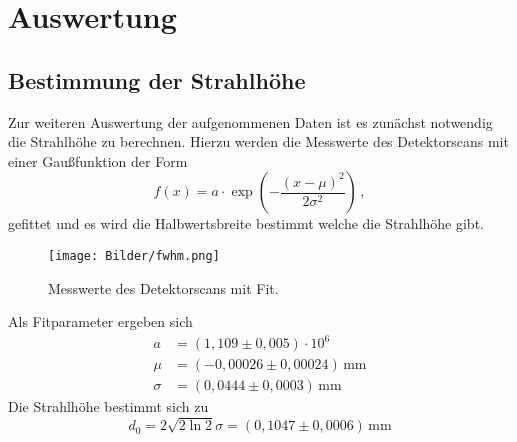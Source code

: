 \section{Auswertung}
\subsection{Bestimmung der Strahlhöhe}
Zur weiteren Auswertung der aufgenommenen Daten ist es zunächst notwendig die Strahlhöhe zu berechnen. Hierzu werden die Messwerte des Detektorscans mit einer Gaußfunktion der Form
\begin{equation}
  f(x)=a\cdot \exp\left(-\frac{(x-\mu)^2}{2\sigma^2}\right)\,,
\end{equation}
gefittet und es wird die Halbwertsbreite bestimmt welche die Strahlhöhe gibt.
\begin{figure}[h]
  \centering
  \texttt{[image: Bilder/fwhm.png]}
  \caption{Messwerte des Detektorscans mit Fit.}
\end{figure}
Als Fitparameter ergeben sich
\begin{align}
a&=(1{,}109\pm0{,}005)\cdot10^6\nonumber\\
\mu&=(-0{,}00026\pm0{,}00024)\,\si{\mm}\nonumber\\
\sigma&=(0{,}0444\pm0{,}0003)\,\si{\mm}
\end{align}
Die Strahlhöhe bestimmt sich zu
\begin{equation}
d_0=2\sqrt{2\ln2}\sigma=(0{,}1047\pm0{,}0006)\,\si{\mm}
\end{equation}\\
